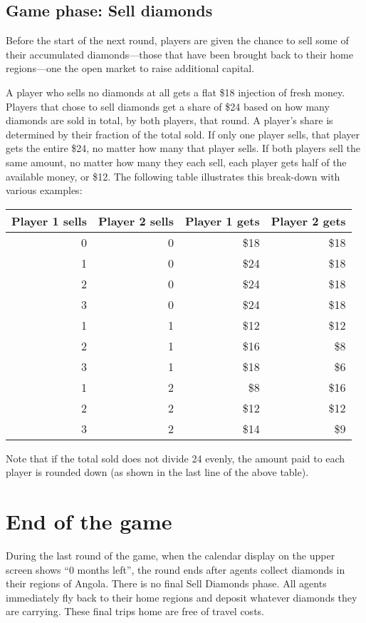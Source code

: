 \documentclass[8pt]{extbook}
\begin{document}
\subsection{Game phase:  Sell diamonds}
\label{sec:sellPhase}

Before the start of the next round, players are given the chance to sell some of their accumulated diamonds---those that have been brought back to their home regions---one the open market to raise additional capital.

A player who sells no diamonds at all gets a flat \$18 injection of fresh money.  Players that chose to sell diamonds get a share of \$24 based on how many diamonds are sold in total, by both players, that round.  A player's share is determined by their fraction of the total sold.  If only one player sells, that player gets the entire \$24, no matter how many that player sells.  If both players sell the same amount, no matter how many they each sell, each player gets half of the available money, or \$12.  The following table illustrates this break-down with various examples:
\begin{center}
\begin{tabular}{r|r||r|r}
Player 1 sells & Player 2 sells & Player 1 gets & Player 2 gets\\
\hline
\hline
0 & 0 & \$18 & \$18 \\
\hline
1 & 0 & \$24 & \$18 \\
2 & 0 & \$24 & \$18 \\
3 & 0 & \$24 & \$18 \\
\hline
1 & 1 & \$12 & \$12 \\
2 & 1 & \$16 & \$8 \\
3 & 1 & \$18 & \$6 \\
\hline
1 & 2 & \$8 & \$16 \\
2 & 2 & \$12 & \$12 \\
3 & 2 & \$14 & \$9 \\
\end{tabular} 
\end{center}
Note that if the total sold does not divide 24 evenly, the amount paid to each player is rounded down (as shown in the last line of the above table).


\section{End of the game}

During the last round of the game, when the calendar display on the upper screen shows ``0 months left'', the round ends after agents collect diamonds in their regions of Angola.  There is no final Sell Diamonds phase.  All agents immediately fly back to their home regions and deposit whatever diamonds they are carrying.  These final trips home are free of travel costs.
\end{document}
